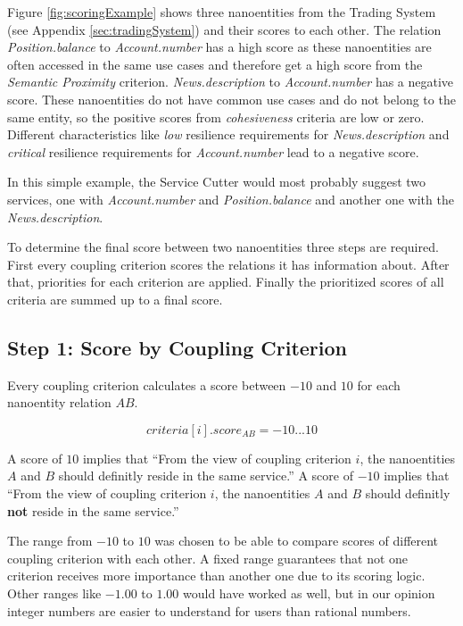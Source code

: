 Figure \ref{fig:scoringExample} shows three nanoentities from the Trading System (see Appendix \ref{sec:tradingSystem}) and their scores to each other. The relation \textit{Position.balance} to \textit{Account.number} has a high score as these nanoentities are often accessed in the same use cases and therefore get a high score from the \textit{Semantic Proximity} criterion. \textit{News.description} to \textit{Account.number} has a negative score. These nanoentities do not have common use cases and do not belong to the same entity, so the positive scores from \textit{cohesiveness} criteria are low or zero. Different characteristics like \textit{low} resilience requirements for \textit{News.description} and \textit{critical} resilience requirements for \textit{Account.number} lead to a negative score. 

In this simple example, the Service Cutter would most probably suggest two services, one with \textit{Account.number} and \textit{Position.balance} and another one with the \textit{News.description}.

To determine the final score between two nanoentities three steps are required. First every coupling criterion scores the relations it has information about. After that, priorities for each criterion are applied. Finally the prioritized scores of all criteria are summed up to a final score.

\subsection{Step 1: Score by Coupling Criterion}

Every coupling criterion calculates a score between $-10$ and $10$ for each nanoentity relation $AB$. 

\begin{displaymath}
criteria[i].score_{AB} = -10 ... 10
\end{displaymath}

A score of $10$ implies that \enquote{From the view of coupling criterion $i$, the nanoentities $A$ and $B$ should definitly reside in the same service.} A score of $-10$ implies that \enquote{From the view of coupling criterion $i$, the nanoentities $A$ and $B$ should definitly \textbf{not} reside in the same service.} 

The range from $-10$ to  $10$ was chosen to be able to compare scores of different coupling criterion with each other. A fixed range guarantees that not one criterion receives more importance than another one due to its scoring logic. Other ranges like $-1.00$ to $1.00$ would have worked as well, but in our opinion integer numbers are easier to understand for users than rational numbers. 

